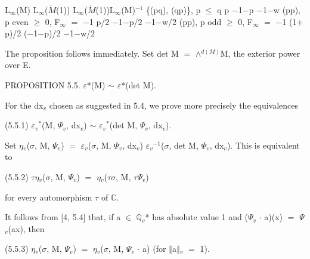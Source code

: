 \documentclass[10pt,twoside]{article}
\begin{document}
L\ensuremath{_{∞}}(M)       L\ensuremath{_{∞}}(\ensuremath{\check{M}}(1))       L\ensuremath{_{∞}}(\ensuremath{\check{M}}(1))L\ensuremath{_{∞}}(M)\ensuremath{^{-1}} \{(pq), (qp)\}, p \ensuremath{≤} q                  p             \ensuremath{−}1\ensuremath{−}p                   \ensuremath{−}1\ensuremath{−}w (pp), p even \ensuremath{≥} 0, F\ensuremath{_{∞}} \ensuremath{=} \ensuremath{−}1          p/2           \ensuremath{−}1\ensuremath{−}p/2                 \ensuremath{−}1\ensuremath{−}w/2 (pp), p odd \ensuremath{≥} 0, F\ensuremath{_{∞}} \ensuremath{=} \ensuremath{−}1           (1\ensuremath{+}p)/2       (\ensuremath{−}1\ensuremath{−}p)/2               \ensuremath{−}1\ensuremath{−}w/2\par
The proposition follows immediately. Set det M \ensuremath{=} \ensuremath{∧}\ensuremath{^{d(M)}}M, the exterior power over E.\par
PROPOSITION 5.5. \ensuremath{ε}*(M) \ensuremath{∼} \ensuremath{ε}*(det M).\par
For the dx\ensuremath{_{v}} chosen as suggested in 5.4, we prove more precisely the equivalences\par
(5.5.1)    \ensuremath{ε}\ensuremath{_{v}}\ensuremath{^{*}}(M, \ensuremath{Ψ}\ensuremath{_{v}}, dx\ensuremath{_{v}}) \ensuremath{∼} \ensuremath{ε}\ensuremath{_{v}}\ensuremath{^{*}}(det M, \ensuremath{Ψ}\ensuremath{_{v}}, dx\ensuremath{_{v}}).\par
Set \ensuremath{η}\ensuremath{_{v}}(\ensuremath{σ}, M, \ensuremath{Ψ}\ensuremath{_{v}}) \ensuremath{=} \ensuremath{ε}\ensuremath{_{v}}(\ensuremath{σ}, M, \ensuremath{Ψ}\ensuremath{_{v}}, dx\ensuremath{_{v}}) \ensuremath{ε}\ensuremath{_{v}}\ensuremath{^{-1}}(\ensuremath{σ}, det M, \ensuremath{Ψ}\ensuremath{_{v}}, dx\ensuremath{_{v}}). This is equivalent to\par
(5.5.2)    \ensuremath{τ}\ensuremath{η}\ensuremath{_{v}}(\ensuremath{σ}, M, \ensuremath{Ψ}\ensuremath{_{v}}) \ensuremath{=} \ensuremath{η}\ensuremath{_{v}}(\ensuremath{τ}\ensuremath{σ}, M, \ensuremath{τ}\ensuremath{Ψ}\ensuremath{_{v}})\par
for every automorphism \ensuremath{τ} of \ensuremath{ℂ}.\par
It follows from [4, 5.4] that, if a \ensuremath{∈} \ensuremath{ℚ}\ensuremath{_{v}}* has absolute value 1 and (\ensuremath{Ψ}\ensuremath{_{v}} \ensuremath{·} a)(x) \ensuremath{=} \ensuremath{Ψ}\ensuremath{_{v}}(ax), then\par
(5.5.3)    \ensuremath{η}\ensuremath{_{v}}(\ensuremath{σ}, M, \ensuremath{Ψ}\ensuremath{_{v}}) \ensuremath{=} \ensuremath{η}\ensuremath{_{v}}(\ensuremath{σ}, M, \ensuremath{Ψ}\ensuremath{_{v}} \ensuremath{·} a)   (for \ensuremath{‖}a\ensuremath{‖}\ensuremath{_{v}} \ensuremath{=} 1).\par
\end{document}
